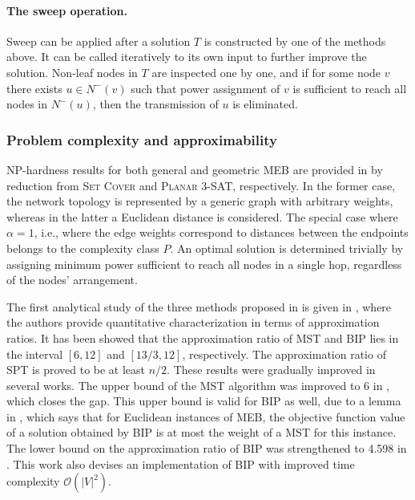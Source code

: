 \paragraph{The sweep operation.}
Sweep can be applied after a solution $T$ is constructed by one of the methods above.
It can be called iteratively to its own input to further improve the solution.
Non-leaf nodes in $T$ are inspected one by one, and if for some node $v$ there exists $u\in N^-(v)$ such that power assignment of $v$ is sufficient to reach all nodes in $N^-(u)$, 
then the transmission of $u$ is eliminated.

\subsubsection{Problem complexity and approximability}

NP-hardness results for both general and geometric MEB are provided in \cite{cagalj02} by reduction from \textsc{Set Cover} and \textsc{Planar 3-SAT}, respectively.
In the former case, the network topology is represented by a generic graph with arbitrary weights, whereas in the latter a Euclidean distance is considered.
The special case where $\alpha=1$, i.e., where the edge weights correspond to distances between the endpoints belongs to the complexity class $P$.
An optimal solution is determined trivially by assigning minimum power sufficient to reach all nodes in a single hop, regardless of the nodes' arrangement.

The first analytical study of the three methods proposed in \cite{wieselthier00} is given in \cite{wan02}, where the authors provide quantitative characterization in terms of approximation ratios.
It has been showed that the approximation ratio of MST and BIP lies in the interval $\left[6,12\right]$ and $\left[13/3,12\right]$, respectively.
The approximation ratio of SPT is proved to be at least $n/2$.
These results were gradually improved in several works. 
The upper bound of the MST algorithm was improved to 6 in \cite{ambuhl05}, which closes the gap. %
This upper bound is valid for BIP as well, due to a lemma in \cite{wan02},
which says that for Euclidean instances of MEB, the objective function value of a solution obtained by BIP is at most the weight of a MST for this instance.
The lower bound on the approximation ratio of BIP was strengthened to 4.598 in \cite{bauer09}. 
This work also devises an implementation of BIP with improved time complexity $\mathcal{O}(|V|^2)$.


